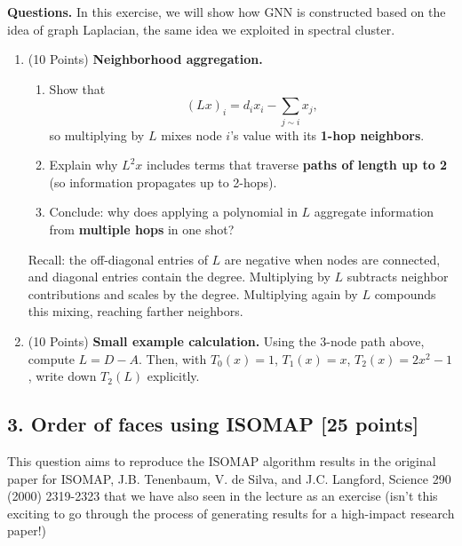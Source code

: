 \documentclass[twoside,10pt]{article}
\begin{document}
\medskip
\textbf{Questions.} In this exercise, we will show how GNN is constructed based on the idea of graph Laplacian, the same idea we exploited in spectral cluster. 
\begin{enumerate}[label=(\arabic*)]
    \item (10 Points) \textbf{Neighborhood aggregation.}
    \begin{enumerate}[label=(\alph*)]
        \item Show that 
        \[
        (Lx)_i = d_i x_i - \sum_{j\sim i} x_j,
        \]
        so multiplying by $L$ mixes node $i$’s value with its \textbf{1-hop neighbors}.  
        \item Explain why $L^2 x$ includes terms that traverse \textbf{paths of length up to 2} (so information propagates up to 2-hops).  
        \item Conclude: why does applying a polynomial in $L$ aggregate information from \textbf{multiple hops} in one shot?
    \end{enumerate}

    \begin{tcolorbox}[colback=gray!10,colframe=gray!60!black,title=Hint]
    Recall: the off-diagonal entries of $L$ are negative when nodes are connected, and diagonal entries contain the degree. 
    Multiplying by $L$ subtracts neighbor contributions and scales by the degree. Multiplying again by $L$ compounds this mixing, reaching farther neighbors.
    \end{tcolorbox}

    \item  (10 Points)  \textbf{Small example calculation.}  
    Using the 3-node path above, compute $L=D-A$. Then, with $T_0(x)=1$, $T_1(x)=x$, $T_2(x)=2x^2-1$, write down $T_2(L)$ explicitly.
\end{enumerate}


\subsection*{3. Order of faces using ISOMAP [25 points]}

This question aims to reproduce the ISOMAP algorithm results in the original paper for ISOMAP, J.B. Tenenbaum, V. de Silva, and J.C. Langford, Science 290 (2000) 2319-2323 that we have also seen in the lecture as an exercise (isn't this exciting to go through the process of generating results for a high-impact research paper!) 
\end{document}
